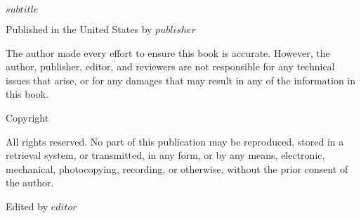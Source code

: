 \documentclass%
[10pt] %
{book} %
\def\subtitle{$subtitle$}
\def\editor{$editor$}
\def\publisher{$publisher$}
\begin{document}
  \begin{center}

  \makeatletter  \scriptsize \@title \par \makeatother

    \vspace{0.3cm}

    \makeatletter \subtitle \makeatother \par

    \vspace{0.3cm}

    \scriptsize Published in the United States by \publisher \par

    \vspace{0.3cm}

    \scriptsize The author made every effort to ensure this book is accurate. However, the author, publisher, editor, and reviewers are not responsible for any technical issues that arise, or for any damages that may result in any of the information in this book.\par

    \scriptsize Copyright \textcopyright \makeatletter \@date \ \@author \makeatother \par
    \scriptsize All rights reserved. No part of this publication may be reproduced, stored in a retrieval system, or transmitted, in any form, or by any means, electronic, mechanical, photocopying, recording, or otherwise, without the prior consent of the author. \par

  \end{center}

    \vspace{.3cm}

    \begin{center}

    \scriptsize Edited by \editor \par

      \vspace{0.3cm}

    \end{center}

\clearpage \normalsize
\end{document}
